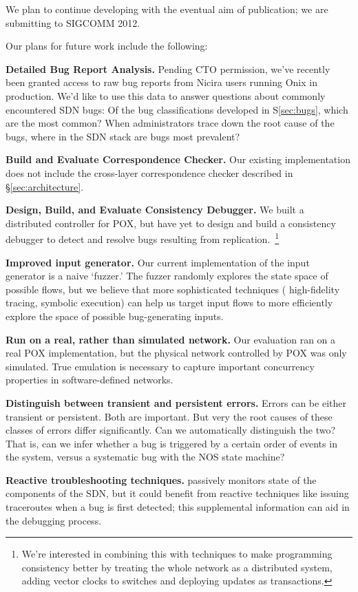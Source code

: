 We plan to continue developing \projectname{} with the eventual aim of
publication; we are submitting to SIGCOMM 2012. 

Our plans for future work include the following:

{\bf Detailed Bug Report Analysis.} Pending CTO permission, we've recently
 been granted access to raw bug reports from Nicira users running Onix in production. 
 We'd like to use this data to answer questions about commonly encountered SDN bugs: 
 Of the bug classifications developed in S\ref{sec:bugs}, which are the most common?    
 When administrators trace down the root cause of the bugs, where in the SDN stack are
 bugs most prevalent?

{\bf Build and Evaluate Correspondence Checker.} Our existing implementation does not
include the cross-layer correspondence checker described in \S\ref{sec:architecture}.

{\bf Design, Build, and Evaluate Consistency Debugger.} We built a distributed controller for
POX, but have yet to design and build a consistency debugger to detect and resolve bugs
resulting from replication.~\footnote{We're interested in combining this with techniques to make
programming consistency better by treating the whole network as a distributed system, \eg{} adding
vector clocks to switches and deploying updates as transactions.}

{\bf Improved input generator.} Our current implementation of the input generator is
a naive `fuzzer.' The fuzzer randomly explores the state space of possible flows, but
we believe that more sophisticated techniques (\eg{} high-fidelity tracing, symbolic execution) can help
us target input flows to more efficiently explore the space of possible bug-generating inputs. 

{\bf Run on a real, rather than simulated network.} Our evaluation ran on a real POX implementation,
but the physical network controlled by POX was only simulated. True emulation
is necessary to capture important concurrency properties in software-defined
networks.

{\bf Distinguish between transient and persistent errors.} Errors can be either
transient or persistent. Both are important. But very the root causes of these
classes of errors differ significantly. Can we
automatically distinguish the two? That is, can we infer whether a bug is
triggered by a certain order of events in the system, versus a systematic bug
with the NOS state machine?

{\bf Reactive troubleshooting techniques.} \projectname{} passively monitors state of the 
components of the SDN, but it could benefit from reactive techniques like issuing traceroutes
when a bug is first detected; this supplemental information can aid in the debugging process.

